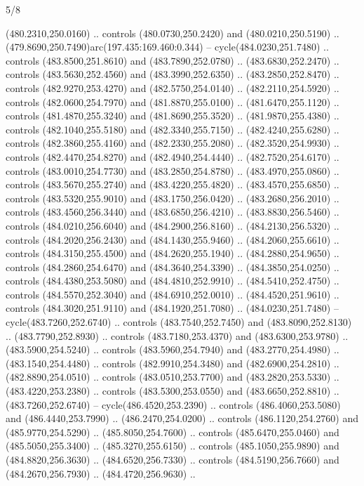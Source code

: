 \begin{flagdescription}{5/8}
\begin{scope}[xshift=0.5\flaglength,yshift=0.5\flagwidth,scale=\flagwidth/475.63]
\begin{scope}[y=0.8pt, x=0.8pt, yscale=-1, xscale=1,shift={(-450,-300)}]
\begin{scope}[cm={{1.0,0.0,0.0,1.0,(-0.0002,0.12556)}},cm={{1.0,0.0,0.0,1.0,(0.00179,0.0)}}]
\begin{scope}[cm={{1.00926,0.0,0.0,1.00926,(-3.1541,-2.47648)}}]
  (480.2310,250.0160) .. controls (480.0730,250.2420) and (480.0210,250.5190) ..
  (479.8690,250.7490)arc(197.435:169.460:0.344) -- cycle(484.0230,251.7480) ..
  controls (483.8500,251.8610) and (483.7890,252.0780) .. (483.6830,252.2470) ..
  controls (483.5630,252.4560) and (483.3990,252.6350) .. (483.2850,252.8470) ..
  controls (482.9270,253.4270) and (482.5750,254.0140) .. (482.2110,254.5920) ..
  controls (482.0600,254.7970) and (481.8870,255.0100) .. (481.6470,255.1120) ..
  controls (481.4870,255.3240) and (481.8690,255.3520) .. (481.9870,255.4380) ..
  controls (482.1040,255.5180) and (482.3340,255.7150) .. (482.4240,255.6280) ..
  controls (482.3860,255.4160) and (482.2330,255.2080) .. (482.3520,254.9930) ..
  controls (482.4470,254.8270) and (482.4940,254.4440) .. (482.7520,254.6170) ..
  controls (483.0010,254.7730) and (483.2850,254.8780) .. (483.4970,255.0860) ..
  controls (483.5670,255.2740) and (483.4220,255.4820) .. (483.4570,255.6850) ..
  controls (483.5320,255.9010) and (483.1750,256.0420) .. (483.2680,256.2010) ..
  controls (483.4560,256.3440) and (483.6850,256.4210) .. (483.8830,256.5460) ..
  controls (484.0210,256.6040) and (484.2900,256.8160) .. (484.2130,256.5320) ..
  controls (484.2020,256.2430) and (484.1430,255.9460) .. (484.2060,255.6610) ..
  controls (484.3150,255.4500) and (484.2620,255.1940) .. (484.2880,254.9650) ..
  controls (484.2860,254.6470) and (484.3640,254.3390) .. (484.3850,254.0250) ..
  controls (484.4380,253.5080) and (484.4810,252.9910) .. (484.5410,252.4750) ..
  controls (484.5570,252.3040) and (484.6910,252.0010) .. (484.4520,251.9610) ..
  controls (484.3020,251.9110) and (484.1920,251.7080) .. (484.0230,251.7480) --
  cycle(483.7260,252.6740) .. controls (483.7540,252.7450) and
  (483.8090,252.8130) .. (483.7790,252.8930) .. controls (483.7180,253.4370) and
  (483.6300,253.9780) .. (483.5900,254.5240) .. controls (483.5960,254.7940) and
  (483.2770,254.4980) .. (483.1540,254.4480) .. controls (482.9910,254.3480) and
  (482.6900,254.2810) .. (482.8890,254.0510) .. controls (483.0510,253.7700) and
  (483.2820,253.5330) .. (483.4220,253.2380) .. controls (483.5300,253.0550) and
  (483.6650,252.8810) .. (483.7260,252.6740) -- cycle(486.4520,253.2390) ..
  controls (486.4060,253.5080) and (486.4440,253.7990) .. (486.2470,254.0200) ..
  controls (486.1120,254.2760) and (485.9770,254.5290) .. (485.8050,254.7600) ..
  controls (485.6470,255.0460) and (485.5050,255.3400) .. (485.3270,255.6150) ..
  controls (485.1050,255.9890) and (484.8820,256.3630) .. (484.6520,256.7330) ..
  controls (484.5190,256.7660) and (484.2670,256.7930) .. (484.4720,256.9630) ..

\end{scope}
\end{scope}
\end{scope}
\end{scope}
\end{flagdescription}
